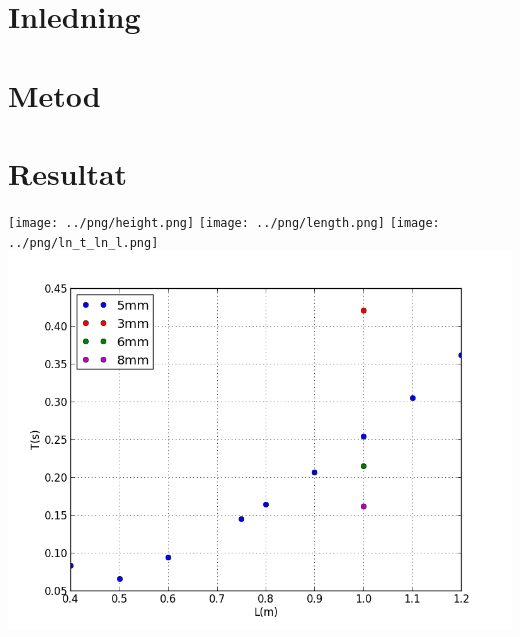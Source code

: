 \documentclass[10pt, titlepage, oneside, a4paper]{article}
\begin{document}
    
	\section{Inledning}
	\section{Metod}
	\section{Resultat}
    \begin{center}
        \texttt{[image: ../png/height.png]}
        \texttt{[image: ../png/length.png]}
        \texttt{[image: ../png/ln\_t\_ln\_l.png]}
        \includegraphics[scale=.5]{../png/plot.png}
    \end{center}
\end{document}
